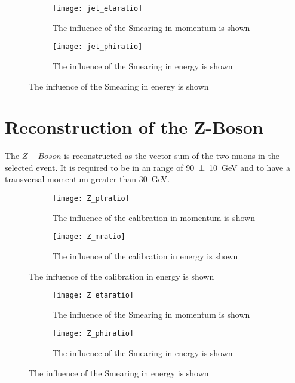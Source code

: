 \begin{figure}[h]
\centering
\begin{subfigure}[b]{0.5\figwidth}
\texttt{[image: jet\_etaratio]}
\caption[Influence of the Smearing on the transversal momentum]{The influence of the Smearing in momentum is shown}
\label{fig:jeteta}
\end{subfigure}
\quad
\begin{subfigure}[b]{0.5\figwidth}
\texttt{[image: jet\_phiratio]}
\caption[Influence of the Smearing on the energy]{The influence of the Smearing in energy is shown}
\label{fig:jetphi}
\end{subfigure}
\end{figure}

\section{Reconstruction of the Z-Boson}

The $Z-Boson$ is reconstructed as the vector-sum of the two muons in the selected event.
It is required to be in an range of \SI{90+-10}{\GeV} and to have a transversal momentum greater than \SI{30}{\GeV}.


\begin{figure}[h]
\centering
\begin{subfigure}[b]{0.5\figwidth}
\texttt{[image: Z\_ptratio]}
\caption[Influence of the JES on the transversal momentum]{The influence of the calibration in momentum is shown}
\label{fig:zpt}
\end{subfigure}
\quad
\begin{subfigure}[b]{0.5\figwidth}
\texttt{[image: Z\_mratio]}
\caption[Influence of the JES on the energy]{The influence of the calibration in energy is shown}
\label{fig:zm}
\end{subfigure}
\end{figure}


\begin{figure}[h]
\centering
\begin{subfigure}[b]{0.5\figwidth}
\texttt{[image: Z\_etaratio]}
\caption[Influence of the Smearing on the transversal momentum]{The influence of the Smearing in momentum is shown}
\label{fig:zeta}
\end{subfigure}
\quad
\begin{subfigure}[b]{0.5\figwidth}
\texttt{[image: Z\_phiratio]}
\caption[Influence of the Smearing on the energy]{The influence of the Smearing in energy is shown}
\label{fig:zphi}
\end{subfigure}
\end{figure}



